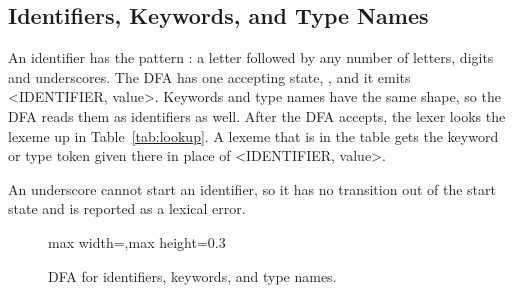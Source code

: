 \subsection{Identifiers, Keywords, and Type Names}

An identifier has the pattern \code{[a-zA-Z][a-zA-Z0-9\_]*}: a letter followed
by any number of letters, digits and underscores. The DFA has one accepting
state, , and it emits \textless IDENTIFIER, value\textgreater.
Keywords and type names have the same shape, so the DFA reads them as
identifiers as well. After the DFA accepts, the lexer looks the lexeme up in
Table~\ref{tab:lookup}. A lexeme that is in the table gets the keyword or type
token given there in place of \textless IDENTIFIER, value\textgreater.

An underscore cannot start an identifier, so it has no transition out of
the start state and is reported as a lexical error.

\begin{figure}[H]
\centering
\begin{adjustbox}{max width=\linewidth,max height=0.3\textheight}
\end{adjustbox}
\caption{DFA for identifiers, keywords, and type names.}
\label{fig:dfa-ident}
\end{figure}

